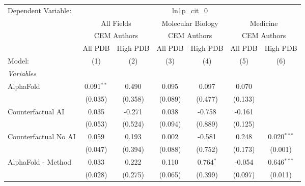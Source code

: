 \begingroup
\centering
\begin{tabular}{lcccccc}
   \tabularnewline \midrule \midrule
   Dependent Variable: & \multicolumn{6}{c}{ln1p\_cit\_0}\\
 & \multicolumn{2}{c}{All Fields} & \multicolumn{2}{c}{Molecular Biology} & \multicolumn{2}{c}{Medicine} \\
\cmidrule(lr){2-3} \cmidrule(lr){4-5} \cmidrule(lr){6-7}
 & \multicolumn{2}{c}{CEM Authors} & \multicolumn{2}{c}{CEM Authors} & \multicolumn{2}{c}{CEM Authors} \\
\cmidrule(lr){2-3} \cmidrule(lr){4-5} \cmidrule(lr){6-7}
 & \multicolumn{1}{c}{All PDB} & \multicolumn{1}{c}{High PDB} & \multicolumn{1}{c}{All PDB} & \multicolumn{1}{c}{High PDB} & \multicolumn{1}{c}{All PDB} & \multicolumn{1}{c}{High PDB} \\
\cmidrule(lr){2-2} \cmidrule(lr){3-3} \cmidrule(lr){4-4} \cmidrule(lr){5-5} \cmidrule(lr){6-6} \cmidrule(lr){7-7}
   Model:                                                     & (1)            & (2)     & (3)            & (4)         & (5)            & (6)\\  
   \midrule
   \emph{Variables}\\
   AlphaFold                                                  & 0.091$^{**}$   & 0.490   & 0.095          & 0.097       & 0.070          &   \\   
                                                              & (0.035)        & (0.358) & (0.089)        & (0.477)     & (0.133)        &   \\   
   Counterfactual AI                                          & 0.035          & -0.271  & 0.038          & -0.758      & -0.161         &   \\   
                                                              & (0.053)        & (0.524) & (0.094)        & (0.889)     & (0.125)        &   \\   
   Counterfactual No AI                                       & 0.059          & 0.193   & 0.002          & -0.581      & 0.248          & 0.020$^{***}$\\   
                                                              & (0.047)        & (0.394) & (0.088)        & (0.752)     & (0.173)        & (0.001)\\   
   AlphaFold - Method                                         & 0.033          & 0.222   & 0.110          & 0.764$^{*}$ & -0.054         & 0.646$^{***}$\\   
                                                              & (0.028)        & (0.275) & (0.065)        & (0.399)     & (0.097)        & (0.011)\\   

\end{tabular}
